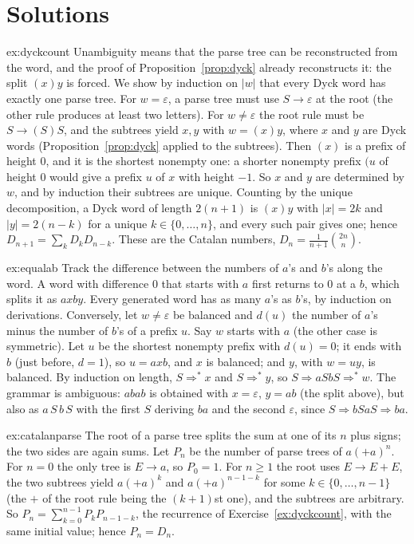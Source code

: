 \section{Solutions}

\begin{solution}{ex:dyckcount}
\idea Unambiguity means that the parse tree can be reconstructed from the word, and the proof of Proposition~\ref{prop:dyck} already reconstructs it: the split $(x)y$ is forced.
\writeup We show by induction on $|w|$ that every Dyck word has exactly one parse tree. For $w=\varepsilon$, a parse tree must use $S\to\varepsilon$ at the root (the other rule produces at least two letters). For $w\ne\varepsilon$ the root rule must be $S\to(S)S$, and the subtrees yield $x,y$ with $w=(x)y$, where $x$ and $y$ are Dyck words (Proposition~\ref{prop:dyck} applied to the subtrees). Then $(x)$ is a prefix of height $0$, and it is the shortest nonempty one: a shorter nonempty prefix $(u$ of height $0$ would give a prefix $u$ of $x$ with height $-1$. So $x$ and $y$ are determined by $w$, and by induction their subtrees are unique.
Counting by the unique decomposition, a Dyck word of length $2(n+1)$ is $(x)y$ with $|x|=2k$ and $|y|=2(n-k)$ for a unique $k\in\{0,\dots,n\}$, and every such pair gives one; hence $D_{n+1}=\sum_kD_kD_{n-k}$. These are the Catalan numbers, $D_n=\frac1{n+1}\binom{2n}n$.
\end{solution}

\begin{solution}{ex:equalab}
\idea Track the difference between the numbers of $a$'s and $b$'s along the word. A word with difference $0$ that starts with $a$ first returns to $0$ at a $b$, which splits it as $axby$.
\writeup Every generated word has as many $a$'s as $b$'s, by induction on derivations. Conversely, let $w\ne\varepsilon$ be balanced and $d(u)$ the number of $a$'s minus the number of $b$'s of a prefix $u$. Say $w$ starts with $a$ (the other case is symmetric). Let $u$ be the shortest nonempty prefix with $d(u)=0$; it ends with $b$ (just before, $d=1$), so $u=axb$, and $x$ is balanced; and $y$, with $w=uy$, is balanced. By induction on length, $S\Rightarrow^*x$ and $S\Rightarrow^*y$, so $S\Rightarrow aSbS\Rightarrow^*w$.
The grammar is ambiguous: $abab$ is obtained with $x=\varepsilon$, $y=ab$ (the split above), but also as $a\,S\,b\,S$ with the first $S$ deriving $ba$ and the second $\varepsilon$, since $S\Rightarrow bSaS\Rightarrow ba$.
\end{solution}

\begin{solution}{ex:catalanparse}
\idea The root of a parse tree splits the sum at one of its $n$ plus signs; the two sides are again sums.
\writeup Let $P_n$ be the number of parse trees of $a(+a)^n$. For $n=0$ the only tree is $E\to a$, so $P_0=1$. For $n\ge1$ the root uses $E\to E+E$, the two subtrees yield $a(+a)^k$ and $a(+a)^{n-1-k}$ for some $k\in\{0,\dots,n-1\}$ (the $+$ of the root rule being the $(k+1)$st one), and the subtrees are arbitrary. So $P_n=\sum_{k=0}^{n-1}P_kP_{n-1-k}$, the recurrence of Exercise~\ref{ex:dyckcount}, with the same initial value; hence $P_n=D_n$.
\end{solution}

